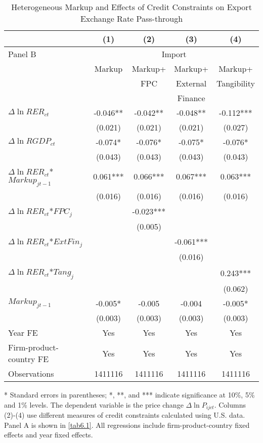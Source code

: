 \begin{table}[htbp]
	\centering
	\caption{Heterogeneous Markup and Effects of Credit Constraints on Export Exchange Rate Pass-through}
	\begin{threeparttable}
		\begin{tabular}{lcccc}
			\midrule          & (1)   & (2)   & (3)   & (4)     \\
			\midrule
			Panel B & \multicolumn{4}{c}{Import} \\
			& Markup & Markup+& Markup+ & Markup+      \\
			&       &FPC& External & Tangibility        \\
			&       & & Finance &  	          \\
			\midrule
			$\Delta \ln RER_{ct}$ & -0.046** & -0.042** & -0.048** & -0.112***  \\
			& (0.021) & (0.021) & (0.021) & (0.027)  \\
			$\Delta \ln RGDP_{ct}$ & -0.074* & -0.076* &-0.075* & -0.076* \\
			& (0.043) & (0.043) & (0.043) & (0.043)  \\
			$\Delta \ln RER_{ct}$*$Markup_{jt-1}$ & 0.061*** & 0.066*** & 0.067*** & 0.063*** \\
			& (0.016) & (0.016) & (0.016) & (0.016) \\
			$\Delta \ln RER_{ct}$*$FPC_{j}$ &       & -0.023*** &       &  \\
			&       & (0.005) &       &   \\
			$\Delta \ln RER_{ct}$*$ExtFin_{j}$ &       &       & -0.061*** &   \\
			&       &       & (0.016) &   \\
			$\Delta \ln RER_{ct}$*$Tang_{j}$ &       &       &       & 0.243***  \\
			&       &       &       & (0.062)  \\
			$Markup_{jt-1}$ & -0.005* & -0.005 & -0.004 & -0.005*  \\
			& (0.003) & (0.003) & (0.003) & (0.003) \\
			Year FE  & Yes   & Yes   & Yes   & Yes       \\
			Firm-product-country FE & Yes   & Yes   & Yes   & Yes       \\
			Observations & 1411116 & 1411116 & 1411116 & 1411116  \\
			\bottomrule
		\end{tabular}
		\begin{tablenotes}
			\footnotesize
			\item[*] Standard errors in parentheses; *, **, and *** indicate significance at 10\%, 5\% and 1\% levels. The dependent variable is the price change $\Delta \ln P_{ijct}$. Columns (2)-(4) use different measures of credit constraints calculated using U.S. data. Panel A is shown in \ref{tab6.1}. All regressions include firm-product-country fixed effects and year fixed effects.
		\end{tablenotes}
	\end{threeparttable}
	\label{tabA.2}
\end{table}

